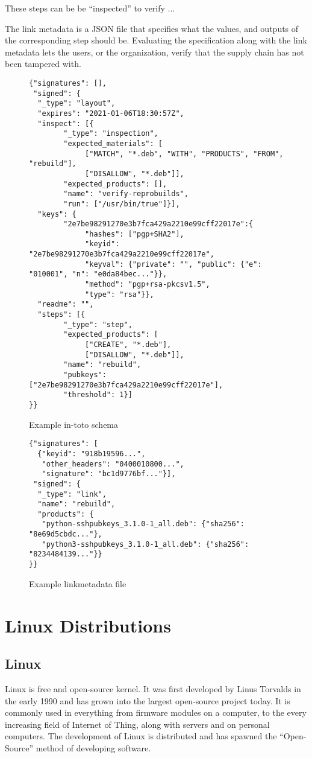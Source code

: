 \documentclass[../Main/thesis.tex]{subfiles}
\begin{document}
These steps can be be ``inspected'' to verify ...

The link metadata is a JSON file that specifies what the values, and outputs of
the corresponding step should be. Evaluating the specification along with the
link metadata lets the users, or the organization, verify that the supply chain
has not been tampered with. 

\begin{figure}[H]
\begin{verbatim}
{"signatures": [],
 "signed": {
  "_type": "layout",
  "expires": "2021-01-06T18:30:57Z",
  "inspect": [{
        "_type": "inspection",
        "expected_materials": [
             ["MATCH", "*.deb", "WITH", "PRODUCTS", "FROM", "rebuild"],
             ["DISALLOW", "*.deb"]],
        "expected_products": [],
        "name": "verify-reprobuilds",
        "run": ["/usr/bin/true"]}],
  "keys": {
        "2e7be98291270e3b7fca429a2210e99cff22017e":{
             "hashes": ["pgp+SHA2"],
             "keyid": "2e7be98291270e3b7fca429a2210e99cff22017e",
             "keyval": {"private": "", "public": {"e": "010001", "n": "e0da84bec..."}},
             "method": "pgp+rsa-pkcsv1.5",
             "type": "rsa"}},
  "readme": "",
  "steps": [{
        "_type": "step",
        "expected_products": [
             ["CREATE", "*.deb"],
             ["DISALLOW", "*.deb"]],
        "name": "rebuild",
        "pubkeys": ["2e7be98291270e3b7fca429a2210e99cff22017e"],
        "threshold": 1}]
}}
\end{verbatim}
\caption{Example in-toto schema}
\label{fig:in-toto-schema}
\end{figure}

\begin{figure}[H]
\begin{verbatim}
{"signatures": [
  {"keyid": "918b19596...",
   "other_headers": "0400010800...",
   "signature": "bc1d9776bf..."}],
 "signed": {
  "_type": "link",
  "name": "rebuild",
  "products": {
   "python-sshpubkeys_3.1.0-1_all.deb": {"sha256": "8e69d5cbdc..."},
   "python3-sshpubkeys_3.1.0-1_all.deb": {"sha256": "8234484139..."}}
}}
\end{verbatim}
\caption{Example linkmetadata file}
\label{fig:linkmetadata}
\end{figure}

\section{Linux Distributions}\label{sec:linux_distributions}
\subsection*{Linux}
Linux is free and open-source kernel. It was first developed by Linus Torvalds
in the early 1990 and has grown into the largest open-source project today. It
is commonly used in everything from firmware modules on a computer, to the every
increasing field of Internet of Thing, along with servers and on personal
computers. The development of Linux is distributed and has spawned the
``Open-Source'' method of developing software.
\end{document}
